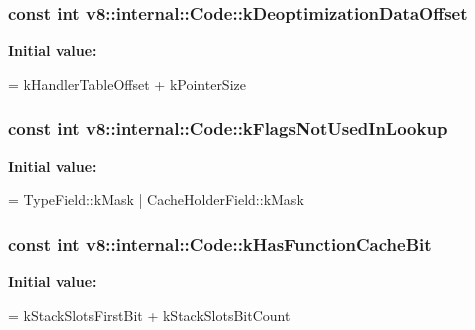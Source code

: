 \subsubsection[{k\+Deoptimization\+Data\+Offset}]{\setlength{\rightskip}{0pt plus 5cm}const int v8\+::internal\+::\+Code\+::k\+Deoptimization\+Data\+Offset\hspace{0.3cm}{\ttfamily [static]}}\label{classv8_1_1internal_1_1_code_ae96feb908e13cef0ff94020a8b3d2692}
{\bfseries Initial value\+:}
\begin{DoxyCode}
=
      kHandlerTableOffset + kPointerSize
\end{DoxyCode}
\hypertarget{classv8_1_1internal_1_1_code_a9adebc0535aeb461df71fa7ca03f2fed}{}
\subsubsection[{k\+Flags\+Not\+Used\+In\+Lookup}]{\setlength{\rightskip}{0pt plus 5cm}const int v8\+::internal\+::\+Code\+::k\+Flags\+Not\+Used\+In\+Lookup\hspace{0.3cm}{\ttfamily [static]}}\label{classv8_1_1internal_1_1_code_a9adebc0535aeb461df71fa7ca03f2fed}
{\bfseries Initial value\+:}
\begin{DoxyCode}
=
      TypeField::kMask | CacheHolderField::kMask
\end{DoxyCode}
\hypertarget{classv8_1_1internal_1_1_code_a36e5de3003e5ff3c60477ca4741b410a}{}
\subsubsection[{k\+Has\+Function\+Cache\+Bit}]{\setlength{\rightskip}{0pt plus 5cm}const int v8\+::internal\+::\+Code\+::k\+Has\+Function\+Cache\+Bit\hspace{0.3cm}{\ttfamily [static]}}\label{classv8_1_1internal_1_1_code_a36e5de3003e5ff3c60477ca4741b410a}
{\bfseries Initial value\+:}
\begin{DoxyCode}
=
      kStackSlotsFirstBit + kStackSlotsBitCount
\end{DoxyCode}
\hypertarget{classv8_1_1internal_1_1_code_abfc7192bae05436fc229b94bbab81648}{}

